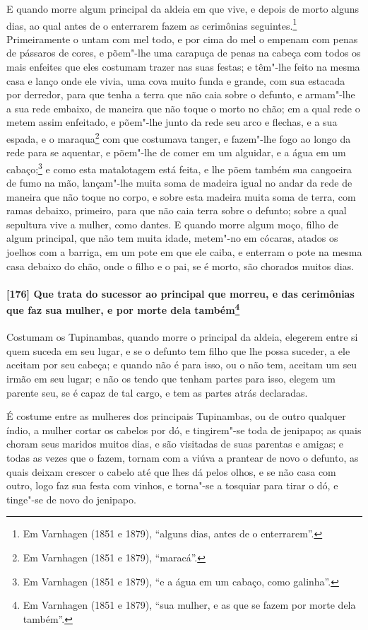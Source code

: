 E quando morre algum principal da aldeia em que vive, e depois de morto alguns dias, ao
qual antes de o enterrarem fazem as cerimônias seguintes.\footnote{ Em Varnhagen (1851 e
1879), ``alguns dias, antes de o enterrarem''.} Primeiramente o untam com mel todo, e por
cima do mel o empenam com penas de pássaros de cores, e põem"-lhe uma carapuça de penas na
cabeça com todos os mais enfeites que eles costumam trazer nas suas festas; e têm"-lhe
feito na mesma casa e lanço onde ele vivia, uma cova muito funda e grande, com sua
estacada por derredor, para que tenha a terra que não caia sobre o defunto, e armam"-lhe a
sua rede embaixo, de maneira que não toque o morto no chão; em a qual rede o metem assim
enfeitado, e põem"-lhe junto da rede seu arco e flechas, e a sua espada, e o
maraqua\footnote{ Em Varnhagen (1851 e 1879), ``maracá''.} com que costumava tanger, e
fazem"-lhe fogo ao longo da rede para se aquentar, e põem"-lhe de comer em um alguidar, e a
água em um cabaço;\footnote{ Em Varnhagen (1851 e 1879), ``e a água em um cabaço, como
galinha''.} e como esta matalotagem está feita, e lhe põem também sua cangoeira de fumo na
mão, lançam"-lhe muita soma de madeira igual no andar da rede de maneira que não toque no
corpo, e sobre esta madeira muita soma de terra, com ramas debaixo, primeiro, para que não
caia terra sobre o defunto; sobre a qual sepultura vive a mulher, como dantes. E quando
morre algum moço, filho de algum principal, que não tem muita idade, metem"-no em cócaras,
atados os joelhos com a barriga, em um pote em que ele caiba, e enterram o pote na mesma
casa debaixo do chão, onde o filho e o pai, se é morto, são chorados muitos dias.

\paragraph{[176] Que trata do sucessor ao principal que morreu, e das cerimônias que faz sua
mulher, e por morte dela também\protect\footnote{ Em Varnhagen (1851 e 1879), ``sua
mulher, e as que se fazem por morte dela também''.}}\quad
Costumam os Tupinambas, quando morre o principal da aldeia, elegerem entre si quem suceda
em seu lugar, e se o defunto tem filho que lhe possa suceder, a ele aceitam por seu
cabeça; e quando não é para isso, ou o não tem, aceitam um seu irmão em seu lugar; e não
os tendo que tenham partes para isso, elegem um parente seu, se é capaz de tal cargo, e
tem as partes atrás declaradas.

É costume entre as mulheres dos principais Tupinambas, ou de outro qualquer índio, a
mulher cortar os cabelos por dó, e tingirem"-se toda de jenipapo; as quais choram seus
maridos muitos dias, e são visitadas de suas parentas e amigas; e todas as vezes que o
fazem, tornam com a viúva a prantear de novo o defunto, as quais deixam crescer o cabelo
até que lhes dá pelos olhos, e se não casa com outro, logo faz sua festa com vinhos, e
torna"-se a tosquiar para tirar o dó, e tinge"-se de novo do jenipapo.


